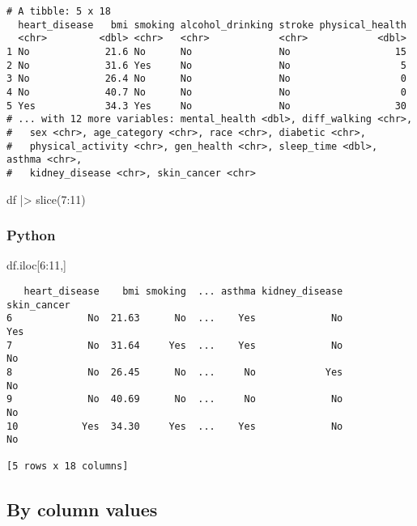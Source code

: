 \documentclass[
  letterpaper,
  DIV=11,
  numbers=noendperiod]{scrreprt}
\newenvironment{Shaded}{\begin{snugshade}}{\end{snugshade}}
\newcommand{\DecValTok}[1]{\textcolor[rgb]{0.68,0.00,0.00}{#1}}
\newcommand{\FunctionTok}[1]{\textcolor[rgb]{0.28,0.35,0.67}{#1}}
\newcommand{\NormalTok}[1]{\textcolor[rgb]{0.00,0.46,0.62}{#1}}
\newcommand{\SpecialCharTok}[1]{\textcolor[rgb]{0.37,0.37,0.37}{#1}}
\begin{document}
\begin{verbatim}
# A tibble: 5 x 18
  heart_disease   bmi smoking alcohol_drinking stroke physical_health
  <chr>         <dbl> <chr>   <chr>            <chr>            <dbl>
1 No             21.6 No      No               No                  15
2 No             31.6 Yes     No               No                   5
3 No             26.4 No      No               No                   0
4 No             40.7 No      No               No                   0
5 Yes            34.3 Yes     No               No                  30
# ... with 12 more variables: mental_health <dbl>, diff_walking <chr>,
#   sex <chr>, age_category <chr>, race <chr>, diabetic <chr>,
#   physical_activity <chr>, gen_health <chr>, sleep_time <dbl>, asthma <chr>,
#   kidney_disease <chr>, skin_cancer <chr>
\end{verbatim}

\begin{Shaded}
\begin{Highlighting}[]
\NormalTok{df }\SpecialCharTok{|\textgreater{}} \FunctionTok{slice}\NormalTok{(}\DecValTok{7}\SpecialCharTok{:}\DecValTok{11}\NormalTok{)}
\end{Highlighting}
\end{Shaded}

\hypertarget{python-15}{%
\subsubsection{Python}\label{python-15}}

\begin{Shaded}
\begin{Highlighting}[]
\NormalTok{df.iloc[}\DecValTok{6}\NormalTok{:}\DecValTok{11}\NormalTok{,]}
\end{Highlighting}
\end{Shaded}

\begin{verbatim}
   heart_disease    bmi smoking  ... asthma kidney_disease  skin_cancer
6             No  21.63      No  ...    Yes             No          Yes
7             No  31.64     Yes  ...    Yes             No           No
8             No  26.45      No  ...     No            Yes           No
9             No  40.69      No  ...     No             No           No
10           Yes  34.30     Yes  ...    Yes             No           No

[5 rows x 18 columns]
\end{verbatim}

\hypertarget{by-column-values}{%
\subsection{By column values}\label{by-column-values}}
\end{document}
